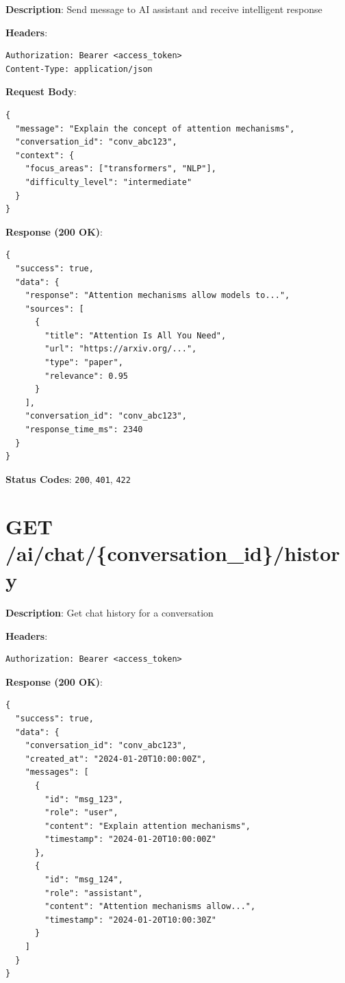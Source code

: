 \documentclass[12pt,a4paper]{report}
\begin{document}
\textbf{Description}: Send message to AI assistant and receive intelligent response

\textbf{Headers}:
\begin{lstlisting}
Authorization: Bearer <access_token>
Content-Type: application/json
\end{lstlisting}

\textbf{Request Body}:
\begin{lstlisting}
{
  "message": "Explain the concept of attention mechanisms",
  "conversation_id": "conv_abc123",
  "context": {
    "focus_areas": ["transformers", "NLP"],
    "difficulty_level": "intermediate"
  }
}
\end{lstlisting}

\textbf{Response (200 OK)}:
\begin{lstlisting}
{
  "success": true,
  "data": {
    "response": "Attention mechanisms allow models to...",
    "sources": [
      {
        "title": "Attention Is All You Need",
        "url": "https://arxiv.org/...",
        "type": "paper",
        "relevance": 0.95
      }
    ],
    "conversation_id": "conv_abc123",
    "response_time_ms": 2340
  }
}
\end{lstlisting}

\textbf{Status Codes}: \texttt{200}, \texttt{401}, \texttt{422}

\section{GET /ai/chat/\{conversation\_id\}/history}

\textbf{Description}: Get chat history for a conversation

\textbf{Headers}:
\begin{lstlisting}
Authorization: Bearer <access_token>
\end{lstlisting}

\textbf{Response (200 OK)}:
\begin{lstlisting}
{
  "success": true,
  "data": {
    "conversation_id": "conv_abc123",
    "created_at": "2024-01-20T10:00:00Z",
    "messages": [
      {
        "id": "msg_123",
        "role": "user",
        "content": "Explain attention mechanisms",
        "timestamp": "2024-01-20T10:00:00Z"
      },
      {
        "id": "msg_124",
        "role": "assistant",
        "content": "Attention mechanisms allow...",
        "timestamp": "2024-01-20T10:00:30Z"
      }
    ]
  }
}
\end{lstlisting}
\end{document}
